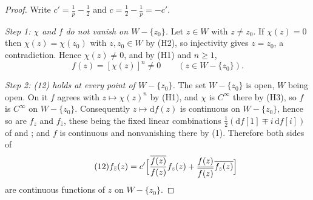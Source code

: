 \begin{proof}
Write $c'=\tfrac1p-\tfrac12$ and $c=\tfrac12-\tfrac1p=-c'$.

\emph{Step 1: $\chi$ and $f$ do not vanish on $W-\{z_0\}$.}  Let $z\in W$ with
$z\neq z_0$.  If $\chi(z)=0$ then $\chi(z)=\chi(z_0)$ with $z,z_0\in W$ by
(H2), so injectivity gives $z=z_0$, a contradiction.  Hence $\chi(z)\neq0$,
and by (H1) and $n\ge1$,
\begin{equation}\tag{1}
  f(z)=[\chi(z)]^{n}\neq0\qquad(z\in W-\{z_0\}).
\end{equation}

\emph{Step 2: (12) holds at \emph{every} point of $W-\{z_0\}$.}  The set
$W-\{z_0\}$ is open, $W$ being open.  On it $f$ agrees with $z\mapsto\chi(z)^n$
by (H1), and $\chi$ is $C^\infty$ there by (H3), so $f$ is $C^\infty$ on
$W-\{z_0\}$.  Consequently $z\mapsto\mathrm{d}f(z)$ is continuous on $W-\{z_0\}$,
hence so are $f_z$ and $f_{\bar z}$, these being the fixed linear combinations
$\tfrac12(\mathrm{d}f[1]\mp i\,\mathrm{d}f[i])$ of  and
; and $f$ is continuous and nonvanishing there by (1).
Therefore both sides of
\begin{equation}\tag{12}
  f_{\bar z}(z)=c'\Bigl[\frac{\overline{f(z)}}{f(z)}f_z(z)
    +\frac{f(z)}{\overline{f(z)}}\overline{f_z(z)}\Bigr]
\end{equation}
are continuous functions of $z$ on $W-\{z_0\}$.


\end{proof}
